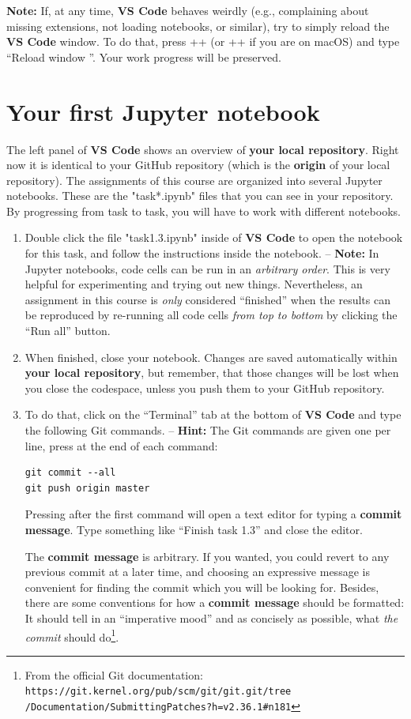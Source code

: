 \documentclass[12pt,a4paper]{article}
\begin{document}
\textbf{Note:} If, at any time, \textbf{VS Code} behaves weirdly (e.g., complaining about missing extensions, not loading notebooks, or similar), try to simply reload the \textbf{VS Code} window. To do that, press \Ctrl+\keystroke{\shift}+ (or \keystroke{\cmd}+\keystroke{\shift}+ if you are on macOS) and type ``Reload window \Return''. Your work progress will be preserved.

\section{Your first Jupyter notebook}
The left panel of \textbf{VS Code} shows an overview of \textbf{your local repository}. Right now it is identical to your GitHub repository (which is the \textbf{origin} of your local repository). The assignments of this course are organized into several Jupyter notebooks. These are the "task*.ipynb" files that you can see in your repository. By progressing from task to task, you will have to work with different notebooks.

\begin{enumerate}
\item Double click the file "task1.3.ipynb" inside of \textbf{VS Code} to open the notebook for this task, and follow the instructions inside the notebook. -- \textbf{Note:} In Jupyter notebooks, code cells can be run in an \emph{arbitrary order}. This is very helpful for experimenting and trying out new things. Nevertheless, an assignment in this course is \emph{only} considered ``finished'' when the results can be reproduced by re-running all code cells \emph{from top to bottom} by clicking the ``Run all'' button.
\item When finished, close your notebook. Changes are saved automatically within \textbf{your local repository}, but remember, that those changes will be lost when you close the codespace, unless you push them to your GitHub repository.
\item To do that, click on the ``Terminal'' tab at the bottom of \textbf{VS Code} and type the following Git commands. -- \textbf{Hint:} The Git commands are given one per line, press \Return at the end of each command:
\begin{Verbatim}[frame=single]
git commit --all
git push origin master
\end{Verbatim}
Pressing \Return after the first command will open a text editor for typing a \textbf{commit message}. Type something like ``Finish task 1.3'' and close the editor.

The \textbf{commit message} is arbitrary. If you wanted, you could revert to any previous commit at a later time, and choosing an expressive message is convenient for finding the commit which you will be looking for. Besides, there are some conventions for how a \textbf{commit message} should be formatted: It should tell in an ``imperative mood'' and as concisely as possible, what \emph{the commit} should do\footnote{From the official Git documentation: \texttt{https://git.kernel.org/pub/scm/git/git.git/tree\\/Documentation/SubmittingPatches?h=v2.36.1\#n181}}.
\end{enumerate}
\end{document}
